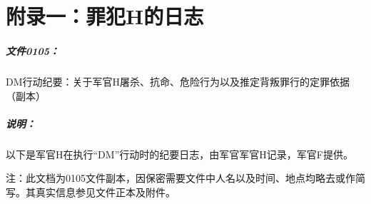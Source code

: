 \chapter{附录一：罪犯H的日志}
\paragraph*{文件0105：}

DM行动纪要：关于军官H屠杀、抗命、危险行为以及推定背叛罪行的定罪依据（副本）

\lineseparator

\paragraph*{说明：}

以下是军官H在执行“DM”行动时的纪要日志，由军官军官H记录，军官F提供。

注：此文档为0105文件副本，因保密需要文件中人名以及时间、地点均略去或作简写。其真实信息参见文件正本及附件。

\lineseparator

